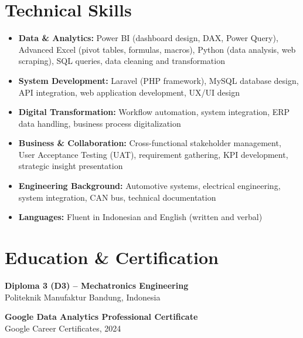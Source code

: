 \documentclass[a4paper,10pt]{article}
\begin{document}
\section*{Technical Skills}
\begin{itemize}
    \item \textbf{Data \& Analytics:} Power BI (dashboard design, DAX, Power Query), Advanced Excel (pivot tables, formulas, macros), Python (data analysis, web scraping), SQL queries, data cleaning and transformation
    \item \textbf{System Development:} Laravel (PHP framework), MySQL database design, API integration, web application development, UX/UI design
    \item \textbf{Digital Transformation:} Workflow automation, system integration, ERP data handling, business process digitalization
    \item \textbf{Business \& Collaboration:} Cross-functional stakeholder management, User Acceptance Testing (UAT), requirement gathering, KPI development, strategic insight presentation
    \item \textbf{Engineering Background:} Automotive systems, electrical engineering, system integration, CAN bus, technical documentation
    \item \textbf{Languages:} Fluent in Indonesian and English (written and verbal)
\end{itemize}

\section*{Education \& Certification}
\textbf{Diploma 3 (D3) – Mechatronics Engineering}\\
Politeknik Manufaktur Bandung, Indonesia

\vspace{4pt}

\textbf{Google Data Analytics Professional Certificate}\\
Google Career Certificates, 2024

\end{document}
